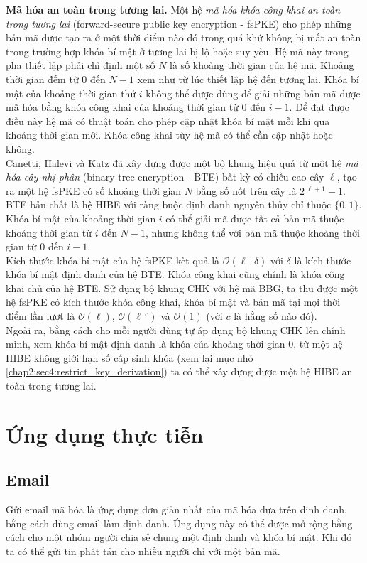 \documentclass[class=report, crop=false]{standalone}
\begin{document}
			\noindent
			\textbf{Mã hóa an toàn trong tương lai.}\hspace{1ex}
			Một hệ \textit{mã hóa khóa công khai an toàn trong tương lai} (forward-secure public key encryption - fsPKE) cho phép những bản mã được tạo ra ở một thời điểm nào đó trong quá khứ không bị mất an toàn trong trường hợp khóa bí mật ở tương lai bị lộ hoặc suy yếu. Hệ mã này trong pha thiết lập phải chỉ định một số $N$ là số khoảng thời gian của hệ mã. Khoảng thời gian đếm từ 0 đến $N - 1$ xem như từ lúc thiết lập hệ đến tương lai. Khóa bí mật của khoảng thời gian thứ $i$ không thể được dùng để giải những bản mã được mã hóa bằng khóa công khai của khoảng thời gian từ $0$ đến $i - 1$. Để đạt được điều này hệ mã có thuật toán cho phép cập nhật khóa bí mật mỗi khi qua khoảng thời gian mới. Khóa công khai tùy hệ mã có thể cần cập nhật hoặc không. \\ \indent
			Canetti, Halevi và Katz \cite{DBLP:conf/eurocrypt/CanettiHK03} đã xây dựng được một bộ khung hiệu quả từ một hệ \textit{mã hóa cây nhị phân} (binary tree encryption - BTE) bất kỳ có chiều cao cây $\ell$, tạo ra một hệ fsPKE có số khoảng thời gian $N$ bằng số nốt trên cây là $2\,^{\ell + 1} - 1$. BTE bản chất là hệ HIBE với ràng buộc định danh nguyên thủy chỉ thuộc $\{0, 1 \}$. Khóa bí mật của khoảng thời gian $i$ có thể giải mã được tất cả bản mã thuộc khoảng thời gian từ $i$ đến $N - 1$, nhưng không thể với bản mã thuộc khoảng thời gian từ $0$ đến $i - 1$. \\ \indent
			Kích thước khóa bí mật của hệ fsPKE kết quả là $\mathcal{O}(\ell \cdot \delta)$ với $\delta$ là kích thước khóa bí mật định danh của hệ BTE. Khóa công khai cũng chính là khóa công khai chủ của hệ BTE. Sử dụng bộ khung CHK với hệ mã BBG, ta thu được một hệ fsPKE có kích thước khóa công khai, khóa bí mật và bản mã tại mọi thời điểm lần lượt là $\mathcal{O}(\ell)$, $\mathcal{O}(\ell\,^c)$ và $\mathcal{O}(1)$ (với $c$ là hằng số nào đó). \\ \indent			
			Ngoài ra, bằng cách cho mỗi người dùng tự áp dụng bộ khung CHK lên chính mình, xem khóa bí mật định danh là khóa của khoảng thời gian $0$, từ một hệ HIBE không giới hạn số cấp sinh khóa (xem lại mục nhỏ \ref{chap2:sec4:restrict_key_derivation}) ta có thể xây dựng được một hệ HIBE an toàn trong tương lai.
	\section{Ứng dụng thực tiễn}
		\subsection{Email}
			Gửi email mã hóa là ứng dụng đơn giản nhất của mã hóa dựa trên định danh, bằng cách dùng email làm định danh. Ứng dụng này có thể được mở rộng bằng cách cho một nhóm người chia sẻ chung một định danh và khóa bí mật. Khi đó ta có thể gửi tin phát tán cho nhiều người chỉ với một bản mã.
\end{document}
